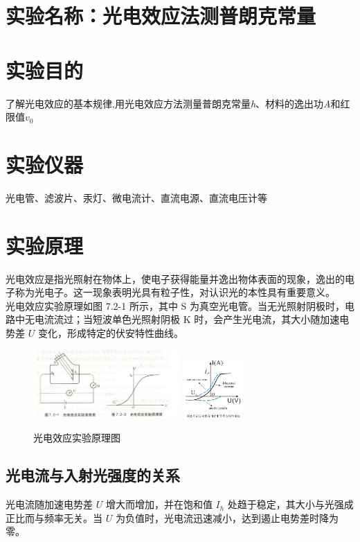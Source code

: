 \documentclass[12pt,a4paper]{article}
\begin{document}
	
	\section{实验名称：光电效应法测普朗克常量}

	\section{实验目的}
	了解光电效应的基本规律,用光电效应方法测量普朗克常量\textit{h}、材料的逸出功\textit{A}和红限值$\textit{v}_{0}$
	
	\section{实验仪器}
	光电管、滤波片、汞灯、微电流计、直流电源、直流电压计等
	
	\section{实验原理}
	光电效应是指光照射在物体上，使电子获得能量并逸出物体表面的现象，逸出的电子称为光电子。这一现象表明光具有粒子性，对认识光的本性具有重要意义。\\
	光电效应实验原理如图 7.2-1 所示，其中 S 为真空光电管。当无光照射阴极时，电路中无电流流过；当短波单色光照射阴极 K 时，会产生光电流，其大小随加速电势差 $U$ 变化，形成特定的伏安特性曲线。
	\begin{figure}[htbp]
		\centering
		\includegraphics[width=0.5\textwidth]{实验原理图1.png}
		\includegraphics[width=0.2\textwidth]{光电管伏安特性曲线.png}
		\caption{光电效应实验原理图}
		\label{fig:chart1}
	\end{figure}

	\subsection{光电流与入射光强度的关系}
	光电流随加速电势差 \( U \) 增大而增加，并在饱和值 \( I_h \) 处趋于稳定，其大小与光强成正比而与频率无关。当 \( U \) 为负值时，光电流迅速减小，达到遏止电势差时降为零。
\end{document}
